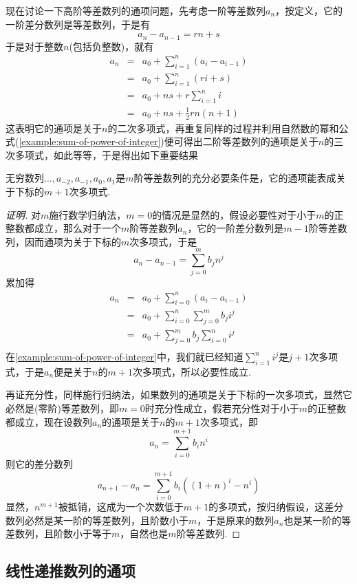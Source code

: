 现在讨论一下高阶等差数列的通项问题，先考虑一阶等差数列$a_n$，按定义，它的一阶差分数列是等差数列，于是有
\[ a_n - a_{n-1} = rn+s \]
于是对于整数$n$(包括负整数)，就有
\begin{eqnarray*}
  a_n & = & a_0 + \sum_{i=1}^n(a_i-a_{i-1}) \\
      & = &  a_0 + \sum_{i=1}^n(ri+s) \\
      & = &  a_0 + ns + r\sum_{i=1}^n i \\
  & = & a_0 + ns + \frac{1}{2}rn(n+1)
\end{eqnarray*}
这表明它的通项是关于$n$的二次多项式，再重复同样的过程并利用自然数的幂和公式(\autoref{example:sum-of-power-of-integer})便可得出二阶等差数列的通项是关于$n$的三次多项式，如此等等，于是得出如下重要结果
\begin{theorem}
  无穷数列$\ldots,a_{-2},a_{-1},a_0,a_1$是$m$阶等差数列的充分必要条件是，它的通项能表成关于下标的$m+1$次多项式.
\end{theorem}

\begin{proof}[证明]
  对$m$施行数学归纳法，$m=0$的情况是显然的，假设必要性对于小于$m$的正整数都成立，那么对于一个$m$阶等差数列$a_n$，它的一阶差分数列是$m-1$阶等差数列，因而通项为关于下标的$m$次多项式，于是
  \[ a_n-a_{n-1} = \sum_{j=0}^m b_jn^j \]
  累加得
  \begin{eqnarray*}
    a_n & = & a_0 + \sum_{i=0}^n(a_i-a_{i-1}) \\
        & = & a_0 + \sum_{i=0}^n\sum_{j=0}^mb_ji^j \\
    & = & a_0 + \sum_{j=0}^mb_j\sum_{i=0}^ni^j \\
  \end{eqnarray*}
  在\autoref{example:sum-of-power-of-integer}中，我们就已经知道$\sum_{i=1}^ni^j$是$j+1$次多项式，于是$a_n$便是关于$n$的$m+1$次多项式，所以必要性成立.

  再证充分性，同样施行归纳法，如果数列的通项是关于下标的一次多项式，显然它必然是(零阶)等差数列，即$m=0$时充分性成立，假若充分性对于小于$m$的正整数都成立，现在设数列$a_n$的通项是关于$n$的$m+1$次多项式，即
  \[ a_n = \sum_{i=0}^{m+1}b_in^i \]
  则它的差分数列
  \[ a_{n+1}-a_n = \sum_{i=0}^{m+1}b_i((1+n)^i-n^i) \]
  显然，$n^{m+1}$被抵销，这成为一个次数低于$m+1$的多项式，按归纳假设，这差分数列必然是某一阶的等差数列，且阶数小于$m$，于是原来的数列$a_n$也是某一阶的等差数列，且阶数小于等于$m$，自然也是$m$阶等差数列.
\end{proof}

\subsection{线性递推数列的通项}
\label{subsec:linear-recurrence-sequence}

